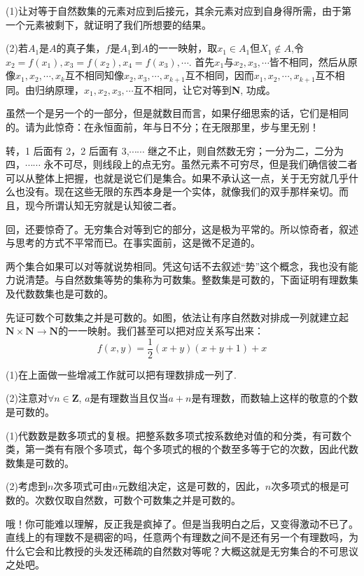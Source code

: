 \documentclass{article}
\theoremstyle{nonumberplain}\theorembodyfont{\normalfont}\theoremsymbol{$\Box$}
\begin{document}
(1)让对等于自然数集的元素对应到后接元，其余元素对应到自身得所需，由于第一个元素被剩下，就证明了我们所想要的结果。

(2)若$A_1$是$A$的真子集，$f$是$A_1$到$A$的一一映射，取$x_1\in A_1$但$X_1\not\in A$,令$x_2=f(x_1), x_3=f(x_2),x_4=f(x_3),\cdots$. 首先$x_1$与$x_2,x_3,\cdots$皆不相同，然后从原像$x_1,x_2,\cdots,x_k$互不相同知像$x_2,x_3,\cdots,x_{k+1}$互不相同，因而$x_1,x_2,\cdots,x_{k+1}$互不相同。由归纳原理，$x_1,x_2,x_3,\cdots$互不相同，让它对等到\textbf{N}, 功成。
\par\vspace{1em}

虽然一个是另一个的一部分，但是就数目而言，如果仔细思索的话，它们是相同的。请为此惊奇：在永恒面前，年与日不分；在无限那里，步与里无别！

转，1 后面有 2，2 后面有 3,$\cdots\cdots$ 继之不止，则自然数无穷；一分为二，二分为四，$\cdots\cdots$ 永不可尽，则线段上的点无穷。虽然元素不可穷尽，但是我们确信彼二者可以从整体上把握，也就是说它们是集合。如果不承认这一点，关于无穷就几乎什么也没有。现在这些无限的东西本身是一个实体，就像我们的双手那样亲切。而且，现今所谓认知无穷就是认知彼二者。

回，还要惊奇了。无穷集合对等到它的部分，这是极为平常的。所以惊奇者，叙述与思考的方式不平常而已。在事实面前，这是微不足道的。

两个集合如果可以对等就说势相同。凭这句话不去叙述“势”这个概念，我也没有能力说清楚。与自然数集等势的集称为可数集。整数集是可数的，下面证明有理数集及代数数集也是可数的。

先证可数个可数集之并是可数的。如图，依法让有序自然数对排成一列就建立起$\mathbf{N}\times\mathbf{N}\to\mathbf{N}$的一一映射。我们甚至可以把对应关系写出来：
$$f(x,y)=\frac12(x+y)(x+y+1)+x$$

(1)在上面做一些增减工作就可以把有理数排成一列了.

(2)注意对$\forall n\in \mathbf{Z}$, $a$是有理数当且仅当$a+n$是有理数，而数轴上这样的敬意的个数是可数的。

(1)代数数是数多项式的复根。把整系数多项式按系数绝对值的和分类，有可数个类，第一类有有限个多项式，每个多项式的根的个数至多等于它的次数，因此代数数集是可数的。

(2)考虑到$n$次多项式可由$n$元数组决定，这是可数的，因此，$n$次多项式的根是可数的。次数仅取自然数，可数个可数集之并是可数的。

哦！你可能难以理解，反正我是疯掉了。但是当我明白之后，又变得激动不已了。直线上的有理数不是稠密的吗，任意两个有理数之间不是还有另一个有理数吗，为什么它会和比教授的头发还稀疏的自然数对等呢？大概这就是无穷集合的不可思议之处吧。
\end{document}
